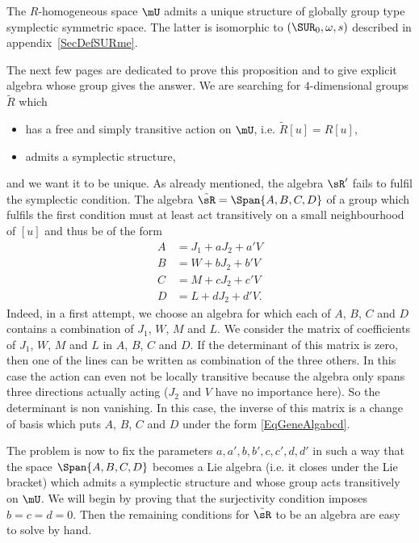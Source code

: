 \begin{proposition}
The $R$-homogeneous space $\mU$ admits a unique structure of globally group type symplectic symmetric space. The latter is isomorphic to $(\SUR_0,\omega,s)$ described in appendix~\ref{SecDefSURme}.
\label{GT}
\end{proposition}
The next few pages are dedicated to prove this proposition and to give explicit algebra whose group gives the answer. We are searching for $4$-dimensional groups $\tilde R$ which
\begin{itemize}
\item has a free and simply transitive action on $\mU$, i.e. $\tilde{R}[u]=R[u]$,
\item admits a symplectic structure,
\end{itemize}
and we want it to be unique.  As already mentioned, the algebra $\sR'$ fails to fulfil the symplectic condition. The algebra $\tilde{\sR}=\Span\{ A,B,C,D \}$ of a group which fulfils the first condition must at least act transitively on a small neighbourhood of $[u]$ and thus be of the form
\begin{subequations}  \label{EqGeneAlgabcd}
\begin{align}
 A&=J_{1}+aJ_{2}+a'V\\
 B&=W+bJ_{2}+b'V\\
 C&=M+cJ_{2}+c'V\\
 D&=L+dJ_{2}+d'V.
\end{align}
\end{subequations}
Indeed, in a first attempt, we choose an algebra for which each of $A$, $B$, $C$ and $D$ contains a combination of $J_{1}$, $W$, $M$ and $L$. We consider the matrix of coefficients of $J_{1}$, $W$, $M$ and $L$ in $A$, $B$, $C$ and $D$. If the determinant of this matrix is zero, then one of the lines can be written as combination of the three others. In this case the action can even not be locally  transitive because the algebra only spans three directions actually acting ($J_{2}$ and $V$ have no importance here). So the determinant is non vanishing. In this case, the inverse of this matrix is a change of basis which puts $A$, $B$, $C$ and $D$ under the form  \eqref{EqGeneAlgabcd}.

The problem is now to fix the parameters $a,a',b,b',c,c',d,d'$ in such a way that the space $\Span\{ A,B,C,D \}$ becomes a Lie algebra (i.e. it closes under the Lie bracket) which admits a symplectic structure and whose group acts transitively on $\mU$. We will begin by proving that the surjectivity condition imposes $b=c=d=0$. Then the remaining conditions for $\tilde \sR$ to be an algebra are easy to solve by hand.

